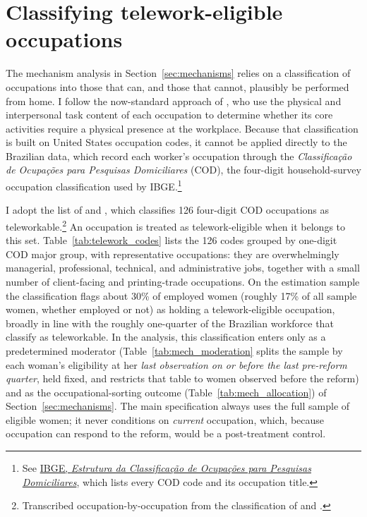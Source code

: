 \clearpage
\section{Classifying telework-eligible occupations}\label{app:telework}

The mechanism analysis in Section~\ref{sec:mechanisms} relies on a classification of occupations into those that can, and those that cannot, plausibly be performed from home. I follow the now-standard approach of \citet{dingelneiman2020}, who use the physical and interpersonal task content of each occupation to determine whether its core activities require a physical presence at the workplace. Because that classification is built on United States occupation codes, it cannot be applied directly to the Brazilian data, which record each worker's occupation through the \emph{Classifica\c{c}\~ao de Ocupa\c{c}\~oes para Pesquisas Domiciliares} (COD), the four-digit household-survey occupation classification used by IBGE.\footnote{See \href{https://ftp.ibge.gov.br/Censos/Censo_Demografico_2010/metodologia/anexos/anexo_7_ocupacao_cod.pdf}{IBGE, \emph{Estrutura da Classifica\c{c}\~ao de Ocupa\c{c}\~oes para Pesquisas Domiciliares}}, which lists every COD code and its occupation title.}

I adopt the list of \citet{goes2020} and \citet{costa2024}, which classifies 126 four-digit COD occupations as teleworkable.\footnote{Transcribed occupation-by-occupation from the classification of \citet{goes2020} and \citet{costa2024}.} An occupation is treated as telework-eligible when it belongs to this set. Table~\ref{tab:telework_codes} lists the 126 codes grouped by one-digit COD major group, with representative occupations: they are overwhelmingly managerial, professional, technical, and administrative jobs, together with a small number of client-facing and printing-trade occupations. On the estimation sample the classification flags about 30\% of employed women (roughly 17\% of all sample women, whether employed or not) as holding a telework-eligible occupation, broadly in line with the roughly one-quarter of the Brazilian workforce that \citet{goes2020} classify as teleworkable. In the analysis, this classification enters only as a predetermined moderator (Table~\ref{tab:mech_moderation} splits the sample by each woman's eligibility at her \emph{last observation on or before the last pre-reform quarter}, held fixed, and restricts that table to women observed before the reform) and as the occupational-sorting outcome (Table~\ref{tab:mech_allocation}) of Section~\ref{sec:mechanisms}. The main specification always uses the full sample of eligible women; it never conditions on \emph{current} occupation, which, because occupation can respond to the reform, would be a post-treatment control.


